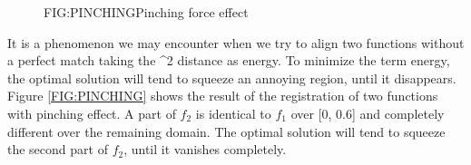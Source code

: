 


 \begin{figure}[Pinching force effect]{FIG:PINCHING}{Pinching force effect}
    \quad
 \end{figure}

It is a phenomenon we may encounter when we try to align two functions without a
perfect match taking the ^2 distance as energy. To minimize the term
energy, the optimal solution will tend to
squeeze an annoying region, until it disappears. Figure \ref{FIG:PINCHING}
shows the result of the registration of two functions with pinching effect.
A part of $f_2$ is identical to $f_1$ over [0, 0.6] and completely different
over the remaining domain. The optimal solution will tend to squeeze the second
part of $f_2$, until it vanishes completely.
